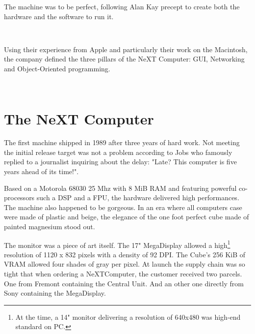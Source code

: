 \par
The machine was to be perfect, following Alan Kay precept to create both the hardware and the software to run it.\\
\par
{}\\
\par

Using their experience from Apple and particularly their work on the Macintosh, the company defined the three pillars of the NeXT Computer: GUI, Networking and Object-Oriented programming.\\
\par
{}\\

\par
\section{The NeXT Computer}
The first machine shipped in 1989 after three years of hard work. Not meeting the initial release target was not a problem according to Jobs who famously replied to a journalist inquiring about the delay: "Late? This computer is five years ahead of its time!".\\
\par
Based on a Motorola 68030 25 Mhz with 8 MiB RAM and featuring powerful co-processors such a DSP and a FPU, the hardware delivered high performances. The machine also happened to be gorgeous. In an era where all computers case were made of plastic and beige, the elegance of the one foot perfect cube made of painted magnesium stood out.\\
\par
{}


The monitor was a piece of art itself. The 17" MegaDisplay allowed a high\footnote{At the time, a 14" monitor delivering a resolution of 640x480 was high-end standard on PC.} resolution of 1120 x 832 pixels with a density of 92 DPI. The Cube's 256 KiB of VRAM allowed four shades of gray per pixel. At launch the supply chain was so tight that when ordering a NeXTComputer, the customer received two parcels. One from Fremont containing the Central Unit. And an other one directly from Sony containing the MegaDisplay.





